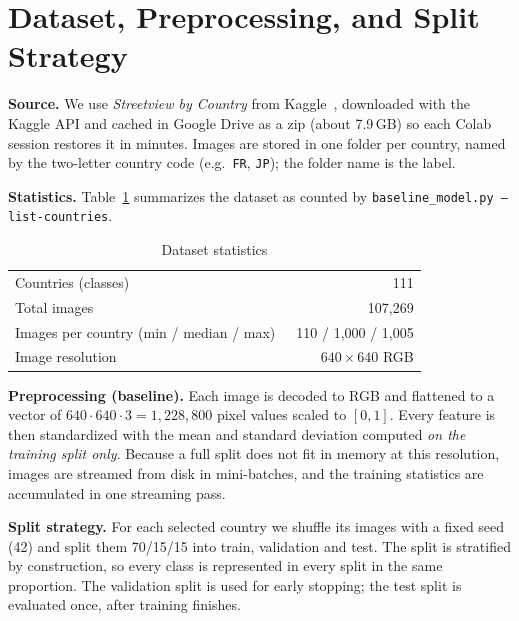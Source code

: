 \documentclass[conference]{IEEEtran}
\begin{document}
\section{Dataset, Preprocessing, and Split Strategy}

\textbf{Source.} We use \emph{Streetview by Country} from Kaggle~\cite{b3},
downloaded with the Kaggle API and cached in Google Drive as a zip (about
7.9\,GB) so each Colab session restores it in minutes. Images are stored in one
folder per country, named by the two-letter country code (e.g.\ \texttt{FR},
\texttt{JP}); the folder name is the label.

\textbf{Statistics.} Table~\ref{tab:data} summarizes the dataset as counted by
\texttt{baseline\_model.py --list-countries}.

\begin{table}[htbp]
\caption{Dataset statistics}
\label{tab:data}
\centering
\begin{tabular}{@{}lr@{}}
\toprule
Countries (classes) & \ 111 \\
Total images & \ 107,269\\
Images per country (min / median / max) & \ {110 / 1,000 / 1,005} \\
Image resolution & $640\times640$ RGB \\
\bottomrule
\end{tabular}
\end{table}

\textbf{Preprocessing (baseline).} Each image is decoded to RGB and flattened
to a vector of $640\cdot640\cdot3 = 1{,}228{,}800$ pixel values scaled to
$[0,1]$. Every feature is then standardized with the mean and standard
deviation computed \emph{on the training split only}. Because a full split
does not fit in memory at this resolution, images are streamed from disk in
mini-batches, and the training statistics are accumulated in one streaming
pass.

\textbf{Split strategy.} For each selected country we shuffle its images with a
fixed seed (42) and split them 70/15/15 into train, validation and test. The
split is stratified by construction, so every class is represented in every
split in the same proportion. The validation split is used for early stopping;
the test split is evaluated once, after training finishes.
\end{document}
